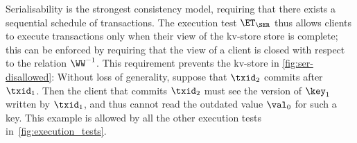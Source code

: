 
Serialisability is the strongest consistency model, requiring that there exists a sequential schedule of transactions. 
The execution test $\ET_{\SER}$ thus allows clients to execute transactions only when 
their view of the kv-store store is complete; this can be enforced by requiring that the view 
of a client is closed with respect to the relation $\WW^{-1}$.
This requirement prevents the kv-store in  \cref{fig:ser-disallowed}: 
Without loss of generality, suppose that $\txid_2$ commits after $\txid_1$. Then the  client that commits $\txid_2$ must see the version of $\key_1$ written by $\txid_1$, 
and thus cannot read the outdated value $\val_0$ for such a key. 
This example is allowed by all the other execution tests in~\cref{fig:execution_tests}.\\

